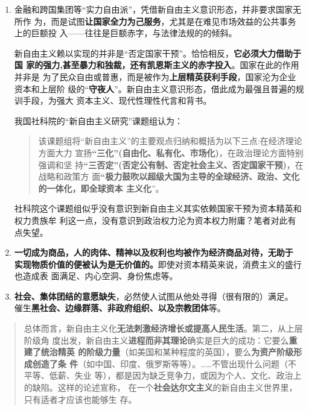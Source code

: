 \begin{enumerate}
\item 金融和跨国集团等“实力自由派”，凭借新自由主义意识形态，并非要求国家无所作
  为，而是试图\textbf{让国家全力为己服务}，尤其是在难见市场效益的公共事务上的巨额投
  入——往往是巨额赤字，与法律法规的的倾斜。

  新自由主义赖以实现的并非是“否定国家干预”。恰恰相反，\textbf{它必须大力借助于国
    家的强力,甚至暴力和独裁，还有凯恩斯主义的赤字投入}。国家在此的作用并非是
  为了民众自由或普惠，而是被作为\textbf{上层精英获利手段}，国家沦为企业资本和上层阶
  级的“\textbf{守夜人}”。新自由主义意识形态，借此成为最强且普遍的规训手段，为强大
  资本主义、现代性理性代言和背书。

  我国社科院的“新自由主义研究”课题组认为：
  \begin{quotation}
    该课题组将“新自由主义”的主要观点归纳和概括为以下三点:在经济理论方面大力
    宣扬\textbf{“三化”(自由化、私有化、市场化)}，在政治理论方面特别强调和坚
    持\textbf{“三否定”(否定公有制、否定社会主义、否定国家干预)}，在战略和政策方
    面\textbf{“极力鼓吹以超级大国为主导的全球经济、政治、文化的一体化，即全球资本
      主义化}”。\cite{newneo}
  \end{quotation}
  社科院这个课题组似乎没有意识到新自由主义其实依赖国家干预为资本精英和权力贵族牟
  利这一点，没有意识到政治权力沦为资本权力附庸？笔者对此有点失望。

\item \textbf{一切成为商品，人的肉体、精神以及权利也均被作为经济商品对待，无助于
    实现物质价值的便被认为是无价值的。}即使对资本精英来说，消费主义的盛行也造成表
  面满足、内心空洞、身份焦虑等。

\item \textbf{社会、集体团结的意愿缺失}，必然使人试图从他处寻得（很有限的）满足。
  催生\textbf{黑社会、边缘群落、非政府组织、以及宗教团体}等。
\end{enumerate}

\begin{quotation}
  总体而言，新自由主义化\textbf{无法刺激经济增长或提高人民生活}。第二，从上层阶级角
  度出发，新自由主义\textbf{进程而非其理论}确实是巨大的成功：它要么\textbf{重建了统治精英
    的阶级力量}（如美国和某种程度的英国），要么\textbf{为资产阶级形成创造了条
    件}（如中国、印度、俄罗斯等等）。……不管出现什么问题（不平等、低薪、失业
  等），都是因为缺乏竞争力，或因为个人、文化、政治上的缺陷。这样的论述宣称，
  在一个\textbf{社会达尔文主义}的新自由主义世界里，只有适者才应该也能够生
  存。
\end{quotation}

